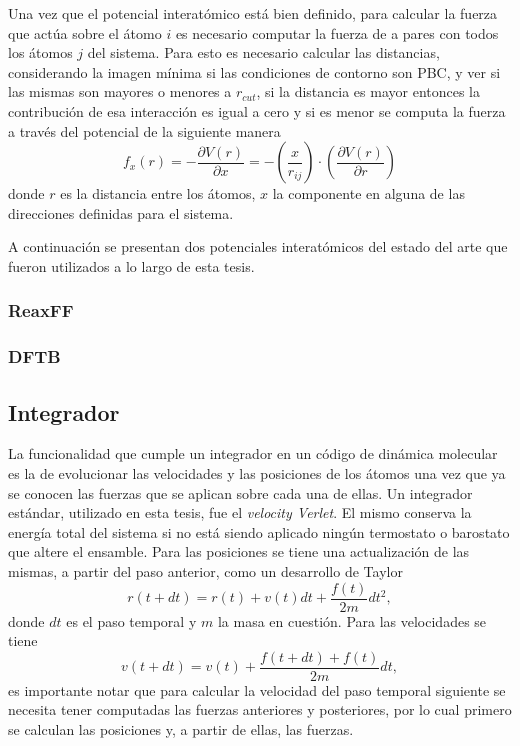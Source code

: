 Una vez que el potencial interatómico está bien definido, para calcular la fuerza
que actúa sobre el átomo $i$ es necesario computar la fuerza de a pares con todos
los átomos $j$ del sistema. Para esto es necesario calcular las distancias,
considerando la imagen mínima si las condiciones de contorno son PBC, y ver si
las mismas son mayores o menores a $r_{cut}$, si la distancia es mayor entonces
la contribución de esa interacción es igual a cero y si es menor se computa la 
fuerza a través del potencial de la siguiente manera
$$
f_x(r) = - \frac{\partial V(r)}{\partial x}
       = - \left( \frac{x}{r_{ij}} \right) \cdot \left( \frac{
                                       \partial V(r)}{\partial r} \right)
$$
donde $r$ es la distancia entre los átomos, $x$ la componente en alguna de
las direcciones definidas para el sistema.

A continuación se presentan dos potenciales interatómicos del estado del arte que
fueron utilizados a lo largo de esta tesis.

\subsubsection{ReaxFF}

\subsubsection{DFTB}

\subsection{Integrador}

La funcionalidad que cumple un integrador en un código de dinámica molecular es
la de evolucionar las velocidades y las posiciones de los átomos una vez que 
ya se conocen las fuerzas que se aplican sobre cada una de ellas. Un integrador
estándar, utilizado en esta tesis, fue el \textit{velocity Verlet}. El mismo 
conserva la energía total del sistema si no está siendo aplicado ningún termostato
o barostato que altere el ensamble. Para las posiciones se tiene una
actualización de las mismas, a partir del paso anterior, como un desarrollo de
Taylor
$$
r(t+dt) = r(t) + v(t) dt + \frac{f(t)}{2m} dt^2,
$$
donde $dt$ es el paso temporal y $m$ la masa en cuestión. Para las velocidades se
tiene
$$
v(t+dt) = v(t) + \frac{f(t+dt)+f(t)}{2m} dt,
$$
es importante notar que para calcular la velocidad del paso temporal siguiente se
necesita tener computadas las fuerzas anteriores y posteriores, por lo cual
primero se calculan las posiciones y, a partir de ellas, las fuerzas.

